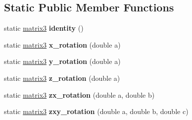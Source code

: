 \subsection*{Static Public Member Functions}
\begin{DoxyCompactItemize}
\item 
static \hyperlink{classmalgo_1_1matrix3}{matrix3} {\bfseries identity} ()\hypertarget{classmalgo_1_1matrix3_a8482dff77205bcc080f619bd277bd2b1}{}\label{classmalgo_1_1matrix3_a8482dff77205bcc080f619bd277bd2b1}

\item 
static \hyperlink{classmalgo_1_1matrix3}{matrix3} {\bfseries x\+\_\+rotation} (double a)\hypertarget{classmalgo_1_1matrix3_ac52e6e5150d1e4ca7481c19ca53360e1}{}\label{classmalgo_1_1matrix3_ac52e6e5150d1e4ca7481c19ca53360e1}

\item 
static \hyperlink{classmalgo_1_1matrix3}{matrix3} {\bfseries y\+\_\+rotation} (double a)\hypertarget{classmalgo_1_1matrix3_a87ec95e23421fa04a3b83e93c416ae6f}{}\label{classmalgo_1_1matrix3_a87ec95e23421fa04a3b83e93c416ae6f}

\item 
static \hyperlink{classmalgo_1_1matrix3}{matrix3} {\bfseries z\+\_\+rotation} (double a)\hypertarget{classmalgo_1_1matrix3_a65a481fda06f047dfe7c346bd52b0799}{}\label{classmalgo_1_1matrix3_a65a481fda06f047dfe7c346bd52b0799}

\item 
static \hyperlink{classmalgo_1_1matrix3}{matrix3} {\bfseries zx\+\_\+rotation} (double a, double b)\hypertarget{classmalgo_1_1matrix3_a4e8ab3fdecc826ddd0297158d103dc9d}{}\label{classmalgo_1_1matrix3_a4e8ab3fdecc826ddd0297158d103dc9d}

\item 
static \hyperlink{classmalgo_1_1matrix3}{matrix3} {\bfseries zxy\+\_\+rotation} (double a, double b, double c)\hypertarget{classmalgo_1_1matrix3_a8e661615035cd7fcdd1286a1b4e8cdb8}{}\label{classmalgo_1_1matrix3_a8e661615035cd7fcdd1286a1b4e8cdb8}

\end{DoxyCompactItemize}
